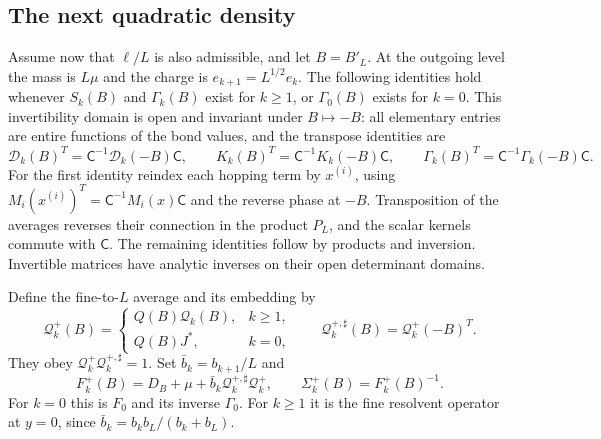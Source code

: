 \documentclass[11pt,letterpaper,reqno]{amsart}
\begin{document}
\subsection{The next quadratic density}
\label{subsec:rg-step-scale-identification}

Assume now that $\ell/L$ is also admissible, and let
$B=B'_L$. At the outgoing level the mass is $L\mu$ and
the charge is $e_{k+1}=L^{1/2}e_k$.
The following identities hold whenever $S_k(B)$ and
$\Gamma_k(B)$ exist for $k\ge1$, or $\Gamma_0(B)$
exists for $k=0$. This invertibility domain is open
and invariant under $B\mapsto-B$: all elementary
entries are entire functions of the bond values,
and the transpose identities are
\begin{equation}\label{eq:rg-step-transpose}
 \mathcal D_k(B)^T=\mathsf C^{-1}\mathcal D_k(-B)\mathsf C,\qquad
 K_k(B)^T=\mathsf C^{-1}K_k(-B)\mathsf C,\qquad
 \Gamma_k(B)^T=\mathsf C^{-1}\Gamma_k(-B)\mathsf C.
\end{equation}
For the first identity reindex each hopping term by
$x^{(i)}$, using
$M_i(x^{(i)})^T=\mathsf C^{-1}M_i(x)\mathsf C$
and the reverse phase at $-B$. Transposition of the
averages reverses their connection in the product
$P_L$, and the scalar kernels commute with
$\mathsf C$. The remaining identities follow by
products and inversion. Invertible matrices have
analytic inverses on their open determinant domains.

Define the fine-to-$L$ average and its embedding by
\[
 \mathcal Q_k^+(B)=
 \begin{cases}Q(B)\mathcal Q_k(B),&k\ge1,\\Q(B)J^*,&k=0,\end{cases}
 \qquad
 \mathcal Q_k^{+,\sharp}(B)=\mathcal Q_k^+(-B)^T.
\]
They obey
$\mathcal Q_k^+\mathcal Q_k^{+,\sharp}=1$.
Set $\bar b_k=b_{k+1}/L$ and
\begin{equation}\label{eq:rg-step-fine-plus}
 F_k^+(B)=D_B+\mu+\bar b_k\mathcal Q_k^{+,\sharp}\mathcal Q_k^+,
 \qquad \Sigma_k^+(B)=F_k^+(B)^{-1}.
\end{equation}
For $k=0$ this is $F_0$ and its inverse $\Gamma_0$.
For $k\ge1$ it is the fine resolvent operator at
$y=0$, since
$\bar b_k=b_kb_L/(b_k+b_L)$.
\end{document}
